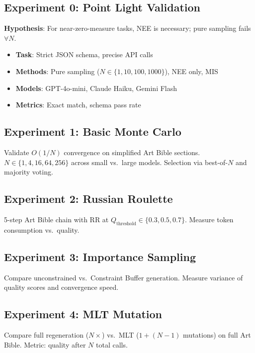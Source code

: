 \documentclass[11pt,twocolumn]{article}
\theoremstyle{definition}
\begin{document}
\subsection{Experiment 0: Point Light Validation}

\textbf{Hypothesis}: For near-zero-measure tasks,
NEE is necessary; pure sampling fails $\forall N$.

\begin{itemize}[nosep]
  \item \textbf{Task}: Strict JSON schema, precise API calls
  \item \textbf{Methods}: Pure sampling ($N \in \{1,10,100,1000\}$),
    NEE only, MIS
  \item \textbf{Models}: GPT-4o-mini, Claude Haiku, Gemini Flash
  \item \textbf{Metrics}: Exact match, schema pass rate
\end{itemize}

\subsection{Experiment 1: Basic Monte Carlo}

Validate $O(1/N)$ convergence on simplified Art Bible sections.
$N \in \{1,4,16,64,256\}$ across small vs.\ large models.
Selection via best-of-$N$ and majority voting.

\subsection{Experiment 2: Russian Roulette}

5-step Art Bible chain with RR at $Q_{\text{threshold}} \in \{0.3, 0.5, 0.7\}$.
Measure token consumption vs.\ quality.

\subsection{Experiment 3: Importance Sampling}

Compare unconstrained vs.\ Constraint Buffer generation.
Measure variance of quality scores and convergence speed.

\subsection{Experiment 4: MLT Mutation}

Compare full regeneration ($N\times$) vs.\
MLT ($1 + (N{-}1)$ mutations) on full Art Bible.
Metric: quality after $N$ total calls.
\end{document}
